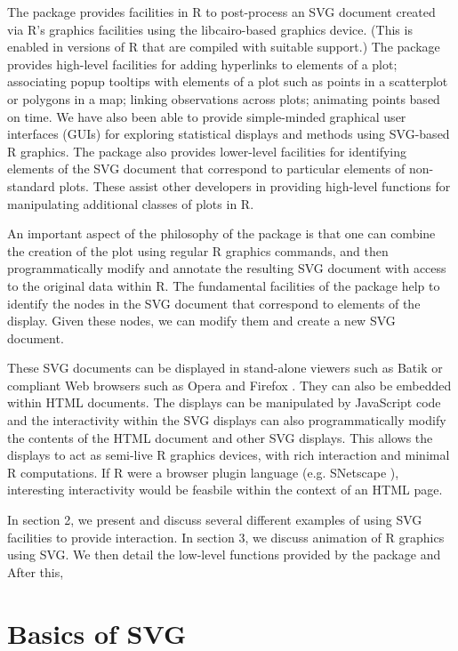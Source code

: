 \documentclass[article]{jss}
\begin{document}
The  package provides facilities in R to
post-process an SVG document created via R's graphics facilities using
the libcairo-based graphics device. (This is enabled in versions of R
that are compiled with suitable support.)  The package provides
high-level facilities for adding hyperlinks to elements of a plot;
associating popup tooltips with elements of a plot such as points in a
scatterplot or polygons in a map; linking observations across plots;
animating points based on time.  We have also been able to provide
simple-minded graphical user interfaces (GUIs) for exploring
statistical displays and methods using SVG-based R graphics.  The
package also provides lower-level facilities for identifying elements
of the SVG document that correspond to particular elements of
non-standard plots.  These assist other developers in providing
high-level functions for manipulating additional classes of plots in
R.

An important aspect of the philosophy of the 
package is that one can combine the creation of the plot using regular
R graphics commands, and then programmatically modify and annotate the
resulting SVG document with access to the original data within R.  The
fundamental facilities of the  package help to
identify the nodes in the SVG document that correspond to elements of
the display. Given these nodes, we can modify them and create a new
SVG document.

These SVG documents can be displayed in stand-alone viewers such as
Batik \cite{batik} or compliant Web browsers such as Opera
\cite{opera} and Firefox \cite{firefox}. They can also be embedded
within HTML documents. The displays can be manipulated by JavaScript
code and the interactivity within the SVG displays can also
programmatically modify the contents of the HTML document and other
SVG displays. This allows the displays to act as semi-live R graphics
devices, with rich interaction and minimal R computations.  If R were
a browser plugin language (e.g. SNetscape \cite{SNetscape}),
interesting interactivity would be feasbile within the context of an
HTML page.


In section 2, we present and discuss several different examples of 
using SVG facilities to provide interaction.
In section 3, we discuss animation of R graphics using SVG.
We then detail the low-level functions provided by the
 package and 
After this, 

\section{Basics of SVG}
\end{document}
